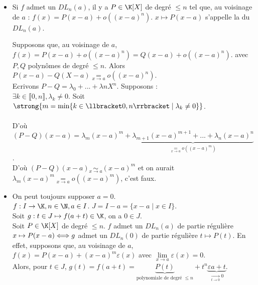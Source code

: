 \documentclass[12pt,a4paper]{report}
\begin{document}
\begin{remarque}
\begin{itemize}
	\item Si $f$ admet un $DL_n(a)$, il y a  $P \in \K[X]$ de degré $\le n$ tel que, au voisinage de $a$ : $f(x) = P(x-a)+ o((x-a)^n)$.
	$x \mapsto P(x-a)$ s'appelle la  du $DL_n(a)$.

	\begin{demo}
	Supposons que, au voisinage de $a$, $f(x) = P(x-a) + o((x-a)^n) = Q(x-a) + o((x-a)^n)$. avec 	$P,Q$ polynômes de degré $\le n$. Alors $P(x-a) - Q(X-a) \underset{x \to a}{=} o((x-a)^n)$. \\
	Ecrivons $P-Q = \lambda_0 + ... + \lambda n X^n$. Supposons : \\
	$\exists k \in \llbracket 0,n \rrbracket, \lambda_k \neq 0$. Soit $\strong{m = \min \{ k \in \llbracket 0,n \rrbracket \mid \lambda_k \neq 0 \}}$. \\ \\
	D'où $(P-Q)(x-a) = \lambda_m (x-a)^m + \underbrace{\lambda_{m+1}(x-a)^{m+1} + ... + \lambda_n (x-a)^n}_{\underset{x \to a}{=} o((x-a)^m)}$. \\
	D'où $(P-Q)(x-a) \underset{x \to a}{\sim} (x-a)^m$ et on aurait $\lambda_m (x-a)^m \underset{x \to a}{=} o((x-a)^m)$, c'est faux.
	\end{demo}
	
	\item On peut toujours supposer $a=0$. \\
	$f : I \to \K, n \in \N, a \in I$. $J = I-a = \{x-a \mid x \in I \}$. \\
	Soit $g : t \in J \mapsto f(a+t) \in \K$, on a $0 \in J$. \\
	Soit $P \in \K[X]$ de degré $\le n$. $f$ admet un $DL_n(a)$ de partie régulière $x \mapsto P(x-a) \\
	\Longleftrightarrow g$ admet un $DL_n(0)$ de partie régulière $t \mapsto P(t)$.
	En effet, supposons que, au voisinage de $a$, $f(x) = P(x-a) + (x-a)^m \varepsilon(x)$ avec $\underset{x \to a}{\lim} \varepsilon(x) = 0$. \\
	Alors, pour $t \in J$, $g(t) = f(a+t) = \underbrace{P(t)}_{\text{polynomiale de degré } \le n} + t^n \underbrace{\varepsilon{a+t}}_{\xrightarrow[t \to 0]{} 0}$.
	

\end{itemize}
\end{remarque}
\end{document}
